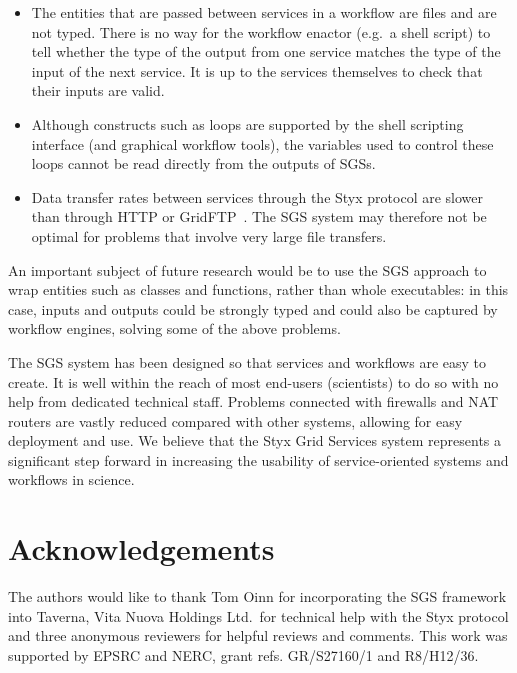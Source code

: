 \documentclass[a4paper]{article}
\begin{document}
\begin{itemize}
	\item The entities that are passed between services in a workflow are files and are not typed.  There is no way for the workflow enactor (e.g.\ a shell script) to tell whether the type of the output from one service matches the type of the input of the next service.  It is up to the services themselves to check that their inputs are valid.
	\item Although constructs such as loops are supported by the shell scripting interface (and graphical workflow tools), the variables used to control these loops cannot be read directly from the outputs of SGSs.
	\item Data transfer rates between services through the Styx protocol are slower than through HTTP or GridFTP~\cite{blower:2005}.  The SGS system may therefore not be optimal for problems that involve very large file transfers.
\end{itemize}

An important subject of future research would be to use the SGS approach to wrap entities such as classes and functions, rather than whole executables: in this case, inputs and outputs could be strongly typed and could also be captured by workflow engines, solving some of the above problems.

The SGS system has been designed so that services and workflows are easy to create.  It is well within the reach of most end-users (scientists) to do so with no help from dedicated technical staff.  Problems connected with firewalls and NAT routers are vastly reduced compared with other systems, allowing for easy deployment and use.  We believe that the Styx Grid Services system represents a significant step forward in increasing the usability of service-oriented systems and workflows in science.
%

\section*{Acknowledgements}
The authors would like to thank Tom Oinn for incorporating the SGS framework into Taverna, Vita Nuova Holdings Ltd.\ for technical help with the Styx protocol and three anonymous reviewers for helpful reviews and comments.  This work was supported by EPSRC and NERC, grant refs. GR/S27160/1 and R8/H12/36.

%
%



\end{document}
